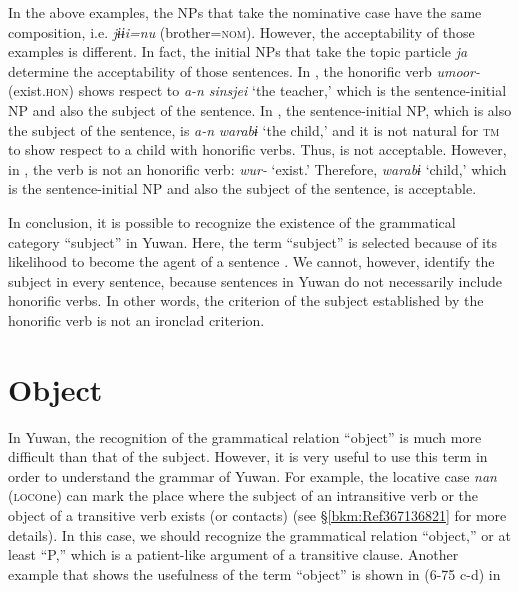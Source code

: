 In the above examples, the NPs that take the nominative case have the same composition, i.e. \textit{jɨɨi=nu} (brother=\textsc{nom}). However, the acceptability of those examples is different. In fact, the initial NPs that take the topic particle \textit{ja} determine the acceptability of those sentences. In , the honorific verb \textit{umoor-} (exist.\textsc{hon}) shows respect to \textit{a-n} \textit{sinsjei} ‘the teacher,’ which is the sentence-initial NP and also the subject of the sentence. In , the sentence-initial NP, which is also the subject of the sentence, is \textit{a-n} \textit{warabɨ} ‘the child,’ and it is not natural for \textsc{tm} to show respect to a child with honorific verbs. Thus,  is not acceptable. However, in , the verb is not an honorific verb: \textit{wur-} ‘exist.’ Therefore, \textit{warabɨ} ‘child,’ which is the sentence-initial NP and also the subject of the sentence, is acceptable.

In conclusion, it is possible to recognize the existence of the grammatical category “subject” in Yuwan. Here, the term “subject” is selected because of its likelihood to become the agent of a sentence \citep[cf.][136]{Andrews2007}. We cannot, however, identify the subject in every sentence, because sentences in Yuwan do not necessarily include honorific verbs. In other words, the criterion of the subject established by the honorific verb is not an ironclad criterion.

\section{Object}
\label{bkm:Ref350115710}\hypertarget{RefHeadingToc395696989}{}
In Yuwan, the recognition of the grammatical relation “object” is much more difficult than that of the subject. However, it is very useful to use this term in order to understand the grammar of Yuwan. For example, the locative case \textit{nan} (\textsc{loco}ne) can mark the place where the subject of an intransitive verb or the object of a transitive verb exists (or contacts) (see §\ref{bkm:Ref367136821} for more details). In this case, we should recognize the grammatical relation “object,” or at least “P,” which is a patient-like argument of a transitive clause. Another example that shows the usefulness of the term “object” is shown in (6-75 c-d) in 
